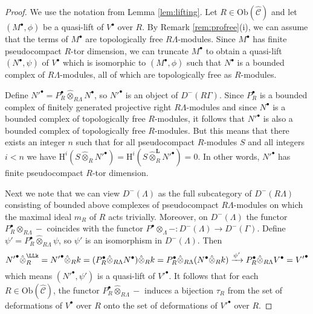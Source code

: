 \documentclass{amsart}
\theoremstyle{plain}
\theoremstyle{definition}
\theoremstyle{remark}
\begin{document}
\begin{proof}
We use the notation from Lemma \ref{lem:lifting}.
Let $R\in\mathrm{Ob}(\hat{\mathcal{C}})$ and let $(M^\bullet, \phi)$ be a quasi-lift of
$V^\bullet$ over $R$. By Remark \ref{rem:profree}(i), we can assume that the terms of
$M^\bullet$ are topologically free $R\Lambda$-modules. Since $M^\bullet$ has finite
pseudocompact $R$-tor dimension, we can truncate $M^\bullet$ to obtain a quasi-lift 
$(N^\bullet, \psi)$ of $V^\bullet$ which is isomorphic to $(M^\bullet, \phi)$ such that $N^\bullet$
is a bounded complex of $R\Lambda$-modules, all of which are topologically free as $R$-modules. 

Define ${N'}^\bullet=P_R^\bullet \hat{\otimes}_{R\Lambda}N^\bullet$,
so ${N'}^\bullet$ is an object of $D^-(R\Gamma)$.
Since $P_R^\bullet$ is a bounded complex of finitely generated projective right $R\Lambda$-modules and 
since $N^\bullet$ is a bounded complex of topologically free
$R$-modules, it follows that ${N'}^\bullet$ is also a bounded complex of topologically free $R$-modules.
But this means that there exists an integer $n$ such that for all pseudocompact $R$-modules $S$
and all integers $i< n$ we have ${\mathrm{H}}^i(S\hat{\otimes}_R{N'}^\bullet)=
{\mathrm{H}}^i(S\hat{\otimes}^{\mathbf{L}}_R{N'}^\bullet)=0$. In other words, ${N'}^\bullet$ has finite pseudocompact
$R$-tor dimension.

Next we note that we can view $D^-(\Lambda)$ as the full subcategory of $D^-(R\Lambda)$
consisting of bounded above complexes of pseudocompact $R\Lambda$-modules
on which the maximal ideal $m_R$ of $R$ acts trivially. Moreover,
on $D^-(\Lambda)$ the functor $P_R^\bullet \hat{\otimes}_{R\Lambda} -$
coincides with the functor $P^\bullet \otimes_{\Lambda} -:D^-(\Lambda)\to D^-(\Gamma)$.
Define $\psi'=P_R^\bullet \hat{\otimes}_{R\Lambda}\psi$, so $\psi'$ is an isomorphism in 
$D^-(\Lambda)$. Then 
$${N'}^\bullet\hat{\otimes}_R^\LLk ={N'}^\bullet\hat{\otimes}_Rk =
(P_R^\bullet \hat{\otimes}_{R\Lambda}N^\bullet)\hat{\otimes}_Rk=
P_R^\bullet \hat{\otimes}_{R\Lambda}(N^\bullet\hat{\otimes}_Rk)
\xrightarrow{\psi'} P_R^\bullet \hat{\otimes}_{R\Lambda}V^\bullet
= {V'}^\bullet$$
which means $({N'}^\bullet,\psi')$ is a quasi-lift of ${V'}^\bullet$. 
It follows that for each $R\in\mathrm{Ob}(\hat{\mathcal{C}})$,
the functor $P_R^\bullet \hat{\otimes}_{R\Lambda}-$ induces a bijection
$\tau_R$ from the set of deformations of $V^\bullet$ over $R$ onto the set of deformations of 
${V'}^\bullet$ over $R$. 


\end{proof}
\end{document}
